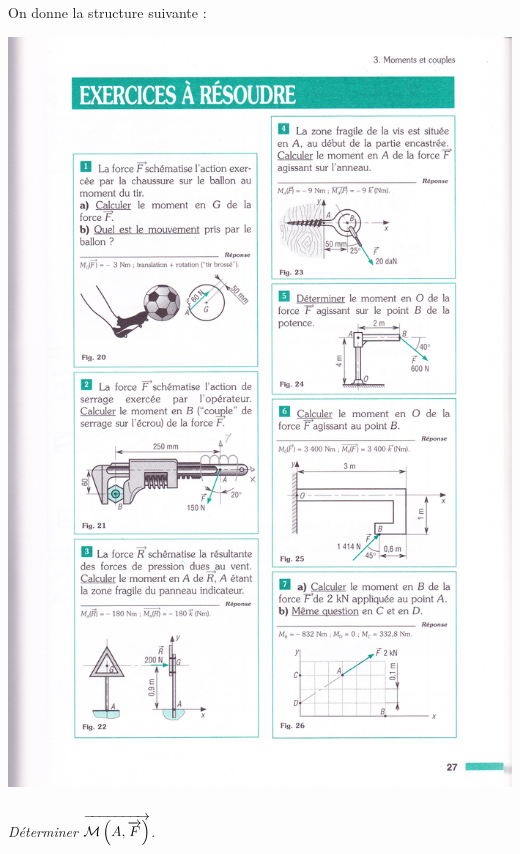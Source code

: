 \documentclass[10pt,fleqn]{article} %
\begin{document}
\begin{multicols}{2}
\setcounter{subparagraph}{0}
On donne la structure suivante : 
\begin{center}
\includegraphics[width=.8\linewidth]{images/fig_23}
\end{center}

\subparagraph{}
\textit{Déterminer $\overrightarrow{\mathcal{M}\left(A,\overrightarrow{F} \right)}$.}




\end{multicols}
\end{document}
